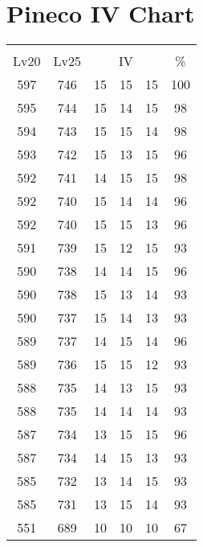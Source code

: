 \documentclass{article}%
\begin{document}
%
\normalsize%
\section{Pineco IV Chart}%
\label{sec:Pineco IV Chart}%
\renewcommand{\arraystretch}{1.5}%
\begin{tabular}{|c|c|c|c|c|c|}%
\hline%
\multicolumn{6}{|c|}{\textcolor{white}{ 
\linebreak{Pineco}
}%
\cellcolor{black}}\\%
\multicolumn{1}{|c}{Lv20}&\multicolumn{1}{c|}{Lv25}&\multicolumn{3}{c|}{IV}&\multicolumn{1}{|c|}{\%}\\%
\hline%
\rowcolor{color100}%
597&746&15&15&15&100\\%
\hline%
\rowcolor{color98}%
595&744&15&14&15&98\\%
\hline%
\rowcolor{color98}%
594&743&15&15&14&98\\%
\hline%
\rowcolor{color96}%
593&742&15&13&15&96\\%
\hline%
\rowcolor{color98}%
592&741&14&15&15&98\\%
\hline%
\rowcolor{color96}%
592&740&15&14&14&96\\%
\hline%
\rowcolor{color96}%
592&740&15&15&13&96\\%
\hline%
\rowcolor{color93}%
591&739&15&12&15&93\\%
\hline%
\rowcolor{color96}%
590&738&14&14&15&96\\%
\hline%
\rowcolor{color93}%
590&738&15&13&14&93\\%
\hline%
\rowcolor{color93}%
590&737&15&14&13&93\\%
\hline%
\rowcolor{color96}%
589&737&14&15&14&96\\%
\hline%
\rowcolor{color93}%
589&736&15&15&12&93\\%
\hline%
\rowcolor{color93}%
588&735&14&13&15&93\\%
\hline%
\rowcolor{color93}%
588&735&14&14&14&93\\%
\hline%
\rowcolor{color96}%
587&734&13&15&15&96\\%
\hline%
\rowcolor{color93}%
587&734&14&15&13&93\\%
\hline%
\rowcolor{color93}%
585&732&13&14&15&93\\%
\hline%
\rowcolor{color93}%
585&731&13&15&14&93\\%
\hline%
\rowcolor{color91}%
551&689&10&10&10&67\\%
\end{tabular}

%
\end{document}
